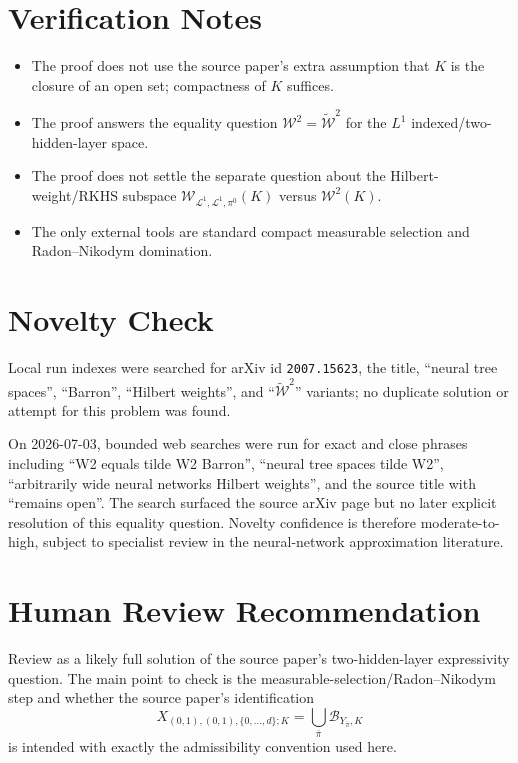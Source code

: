 \documentclass[11pt]{article}
\newcommand{\B}{\mathcal B}
\newcommand{\W}{\mathcal W}
\newcommand{\tW}{\widetilde{\mathcal W}}
\newcommand{\1}{\mathbf 1}
\begin{document}
\section*{Verification Notes}

\begin{itemize}
\item The proof does not use the source paper's extra assumption that $K$ is the closure of an open set; compactness of $K$ suffices.
\item The proof answers the equality question $\W^2=\tW^2$ for the $L^1$ indexed/two-hidden-layer space.
\item The proof does not settle the separate question about the Hilbert-weight/RKHS subspace $\W_{\mathcal L^1,\mathcal L^1,\pi^0}(K)$ versus $\W^2(K)$.
\item The only external tools are standard compact measurable selection and Radon--Nikodym domination.
\end{itemize}

\section*{Novelty Check}

Local run indexes were searched for arXiv id \texttt{2007.15623}, the title, ``neural tree spaces'', ``Barron'', ``Hilbert weights'', and ``$\tW^2$'' variants; no duplicate solution or attempt for this problem was found.

On 2026-07-03, bounded web searches were run for exact and close phrases including ``W2 equals tilde W2 Barron'', ``neural tree spaces tilde W2'', ``arbitrarily wide neural networks Hilbert weights'', and the source title with ``remains open''. The search surfaced the source arXiv page but no later explicit resolution of this equality question. Novelty confidence is therefore moderate-to-high, subject to specialist review in the neural-network approximation literature.

\section*{Human Review Recommendation}

Review as a likely full solution of the source paper's two-hidden-layer expressivity question. The main point to check is the measurable-selection/Radon--Nikodym step and whether the source paper's identification
\[
X_{(0,1),(0,1),\{0,\dots,d\};K}=\bigcup_{\bar\pi}\B_{Y_{\bar\pi},K}
\]
is intended with exactly the admissibility convention used here.
\end{document}
